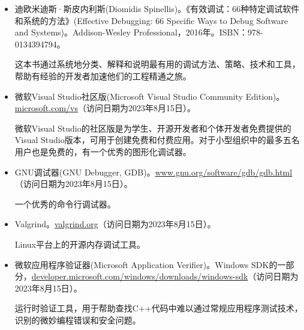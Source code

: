 
\begin{itemize}
\item
迪欧米迪斯·斯皮内利斯(Diomidis Spinellis)。《有效调试：66种特定调试软件和系统的方法》(Effective Debugging: 66 Specific Ways to Debug Software and Systems)。Addison-Wesley Professional，2016年。ISBN：978-0134394794。

\hspace*{\fill}

这本书通过系统地分类、解释和说明最有用的调试方法、策略、技术和工具，帮助有经验的开发者加速他们的工程精通之旅。

\hspace*{\fill}

\item
微软Visual Studio社区版(Microsoft Visual Studio Community Edition)。\url{microsoft.com/vs}（访问日期为2023年8月15日）。

\hspace*{\fill}

微软Visual Studio的社区版是为学生、开源开发者和个体开发者免费提供的Visual Studio版本，可用于创建免费和付费应用。对于小型组织中的最多五名用户也是免费的，有一个优秀的图形化调试器。

\hspace*{\fill}

\item
GNU调试器(GNU Debugger, GDB)。\url{www.gnu.org/software/gdb/gdb.html}（访问日期为2023年8月15日）。

\hspace*{\fill}

一个优秀的命令行调试器。

\hspace*{\fill}

\item
Valgrind。\url{valgrind.org}（访问日期为2023年8月15日）。

\hspace*{\fill}

Linux平台上的开源内存调试工具。

\hspace*{\fill}

\item
微软应用程序验证器(Microsoft Application Verifier)。Windows SDK的一部分，\url{developer.microsoft.com/windows/downloads/windows-sdk}（访问日期为2023年8月15日）。

\hspace*{\fill}

运行时验证工具，用于帮助查找C++代码中难以通过常规应用程序测试技术，识别的微妙编程错误和安全问题。
\end{itemize}